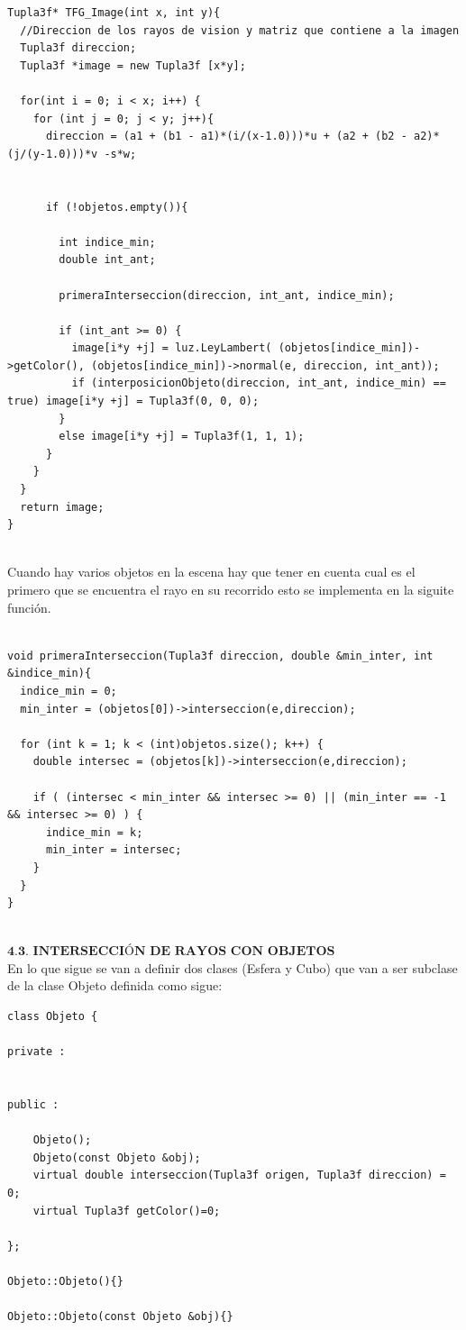 \begin{lstlisting}[style=Consola]
Tupla3f* TFG_Image(int x, int y){
  //Direccion de los rayos de vision y matriz que contiene a la imagen
  Tupla3f direccion;
  Tupla3f *image = new Tupla3f [x*y];

  for(int i = 0; i < x; i++) {
    for (int j = 0; j < y; j++){
      direccion = (a1 + (b1 - a1)*(i/(x-1.0)))*u + (a2 + (b2 - a2)*(j/(y-1.0)))*v -s*w;


      if (!objetos.empty()){

        int indice_min;
        double int_ant;

        primeraInterseccion(direccion, int_ant, indice_min);

        if (int_ant >= 0) {
          image[i*y +j] = luz.LeyLambert( (objetos[indice_min])->getColor(), (objetos[indice_min])->normal(e, direccion, int_ant));
          if (interposicionObjeto(direccion, int_ant, indice_min) == true) image[i*y +j] = Tupla3f(0, 0, 0);
        }	
        else image[i*y +j] = Tupla3f(1, 1, 1);
      }
    }
  }
  return image;
}

\end{lstlisting}
${ }$\\

Cuando hay varios objetos en la escena hay que tener en cuenta cual es el primero que se encuentra el rayo en su recorrido esto se implementa en la siguite función.

\begin{lstlisting}[style=Consola]

void primeraInterseccion(Tupla3f direccion, double &min_inter, int &indice_min){
  indice_min = 0;
  min_inter = (objetos[0])->interseccion(e,direccion);

  for (int k = 1; k < (int)objetos.size(); k++) {
    double intersec = (objetos[k])->interseccion(e,direccion);

    if ( (intersec < min_inter && intersec >= 0) || (min_inter == -1 && intersec >= 0) ) {
      indice_min = k;
      min_inter = intersec;
    }
  }
}

\end{lstlisting}

${ }$\\
$\textbf{4.3. INTERSECCIÓN DE RAYOS CON OBJETOS}$
${ }$\\

En lo que sigue se van a definir dos clases (Esfera y Cubo) que van a ser subclase de la clase Objeto definida como sigue:

\begin{lstlisting}[style=Consola]
class Objeto {

private :


public :

	Objeto();
	Objeto(const Objeto &obj);
	virtual double interseccion(Tupla3f origen, Tupla3f direccion) = 0;
	virtual Tupla3f getColor()=0;

};

Objeto::Objeto(){}

Objeto::Objeto(const Objeto &obj){}
\end{lstlisting}

